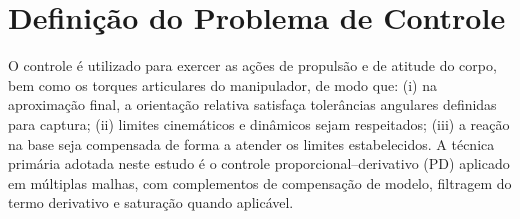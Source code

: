 \section{Definição do Problema de Controle}
\label{sec:definicao_problema_controle}
O controle é utilizado para exercer as ações de propulsão e de atitude do corpo, bem como os torques articulares do manipulador, de modo que:
(i) na aproximação final, a orientação relativa satisfaça tolerâncias angulares definidas para captura;
(ii) limites cinemáticos e dinâmicos sejam respeitados;
(iii) a reação na base seja compensada de forma a atender os limites estabelecidos.
A técnica primária adotada neste estudo é o controle proporcional--derivativo (PD) aplicado em múltiplas malhas, com complementos de compensação de modelo, filtragem do termo derivativo e saturação quando aplicável.



% 


